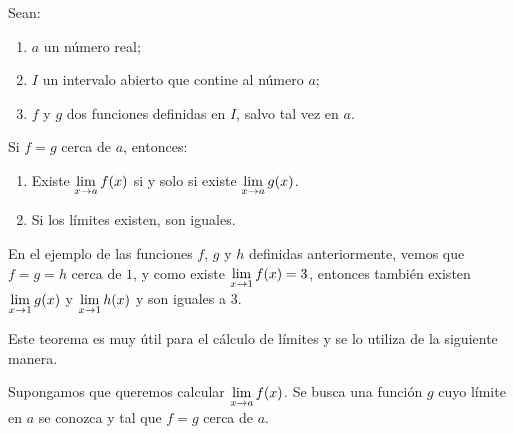 % 

\begin{teocal}\label{eq:limitegeneral}%
Sean:
\begin{enumerate}
\item[] $a$ un número real;
\item[] $I$ un intervalo abierto que contine al número $a$;
\item[] $f$ y $g$ dos funciones definidas en $I$, salvo tal vez en $a$.
\end{enumerate}
Si $f=g$ cerca de $a$, entonces:
\begin{enumerate}
      \item Existe $\displaystyle\limjc{f(x)}{x}{a}$ si y solo si existe $\displaystyle\limjc{g(x)}{x}{a}$.
      \item Si los límites existen, son iguales.
\end{enumerate}
\end{teocal}%

En el ejemplo de las funciones $f$, $g$ y $h$ definidas anteriormente, vemos que $f=g=h$ cerca de $1$, y como existe $\displaystyle\limjc{f(x)}{x}{1}=3$, entonces también existen $\displaystyle\limjc{g(x)}{x}{1}$ y $\displaystyle\limjc{h(x)}{x}{1}$ y son iguales a $3$.

Este teorema es muy útil para el cálculo de límites y se lo utiliza de la siguiente manera.

Supongamos que queremos calcular $\displaystyle\limjc{f(x)}{x}{a}$. Se busca una función $g$ cuyo límite en $a$ se conozca y tal que $f=g$ cerca de $a$.

